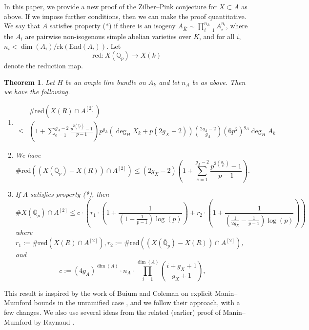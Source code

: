 \documentclass[11pt]{amsart}
\def\Q{\mathbb Q}
\newcommand{\tors}{\mathrm{tors}}
\newcommand{\rk}{\mathrm{rk}}
\newcommand{\End}{\mathrm{End}}
\theoremstyle{plain}
\newtheorem{theorem}{Theorem}
\theoremstyle{definition}
\newcommand{\red}{\mathrm{red}}
\newcommand{\netan}[1]{{\color{blue} \sf $\clubsuit\clubsuit\clubsuit$ Netan: [#1]}}
\begin{document}
In this paper, we provide a new proof of the Zilber--Pink conjecture for $X\subset A$ as above. 
If we impose further conditions, then we can make the proof quantitative. We say that $A$ satisfies property (*) if there is an isogeny $A_{\overline{K}}\sim \prod _{i=1}^{n_A} A_i ^{n_i }$, where the $A_i$ are pairwise non-isogenous simple abelian varieties over $\overline{K}$, and for all $i$, $n_i <\dim (A_i )/\rk (\End (A_i ))$. Let 
\[
\red :X(\overline{\Q }_p )\to X(k)
\]
denote the reduction map.
\begin{theorem}\label{theorem:main}
Let $H$ be an ample line bundle on $A_k$ and let $n_A$ be as above. 
Then we have the following.
\begin{enumerate}
\item 
\begin{align*}
& \# \red (X(R)\cap A^{[2]}) \\
\leq & \left(1+\sum _{e=1}^{g_A-2}\frac{p^{2\binom{g_A}{e}}-1}{p-1}\right)p^{g_A} (\deg _H X_k +p(2g_X -2)) \binom{2g_A -2}{g_A }(6p^2 )^{g_A }\deg _H A_k
\end{align*}
\item We have 
\[
\# \red ((X(\overline{\Q }_p )-X(R))\cap A^{[2]}) \leq (2g_X -2)\left(1+\sum _{e=1}^{g_A -2}\frac{p^{2\binom{g_A }{e}}-1}{p-1}\right).
\]
\item If $A$ satisfies property (*), then
\[
\# X(\overline{\Q }_p )\cap A^{[2]}\leq c\cdot \left( r_1 \cdot \left( 1+\frac{1}{(1 -\frac{1}{p-1})\log (p)}\right)+r_2 \cdot \left( 1+\frac{1}{(\frac{1}{2g_X} -\frac{1}{p-1})\log (p)}\right) \right) 
\]
where $r_1 := \# \red (X(R)\cap A^{[2]}), r_2 := \# \red ((X(\overline{\Q }_p )-X(R))\cap A^{[2]}) $, and 
\[
c:=(4g_A )^{\dim (A)}\cdot n_A \cdot  \prod _{i=1}^{\dim (A)} \binom{i+g_X +1}{g_X +1},
\]
\end{enumerate}
\end{theorem}
This result is inspired by the work of Buium and Coleman on explicit Manin--Mumford bounds in the unramified case \cite{buium:96} \cite{coleman:ramified}, and we follow their approach, with a few changes. We also use several ideas from the related (earlier) proof of Manin--Mumford by Raynaud \cite{raynaud}.
\end{document}
